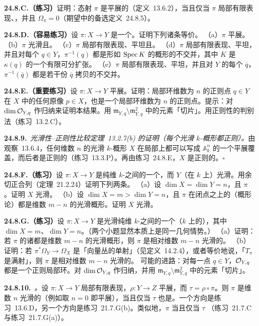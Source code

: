 \textbf{24.8.C.（练习）}\quad 证明：态射 $\pi$ 是平展的（\mbox{定义~13.6.2}），当且仅当 $\pi$ 局部有限表现、\trFlat，并且 $\Omega_\pi=0$（\mbox{期望中的备选定义~24.8.5}）。

\textbf{24.8.D.（容易练习）}\quad 设 $\pi\colon X\to Y$ 是一个\trMorphism。证明下列诸条等价。
（a）$\pi$ 平展。
（b）$\pi$ 光滑且\trUnramified。
（c）$\pi$ 局部有限表现、平坦且\trUnramified。
（d）$\pi$ 局部有限表现、平坦，并且对每个 $q\in Y$，$\pi^{-1}(q)$ 都是形如 $\operatorname{Spec} K$ 的概形的不交并，其中 $K$ 是 $\kappa(q)$ 的一个有限可分扩张。
（e）$\pi$ 局部有限表现、平坦，并且对 $Y$ 的每个\emph{\trGeometricPoint}{} $\overline{q}$，$\pi^{-1}(\overline{q})$ 都是若干份 $\overline{q}$ 拷贝的不交并。

\textbf{24.8.E.（重要练习）}\quad 设 $\pi\colon X\to Y$ 平展。证明：局部环维数为 $n$ 的正则点 $q\in Y$ 在 $X$ 中的任何原像 $p\in X$，也是一个局部环维数为 $n$ 的正则点。提示：对 $\dim\mathcal{O}_{Y,q}$ 作归纳来证明本结果。用 $\mathfrak{m}_{Y,q}\setminus\mathfrak{m}_{Y,q}^2$ 中的元素「切片」。用正则性的\trSlicing{}判别法（\mbox{练习~13.2.C}）。

\textbf{24.8.9.}\ \emph{光滑性--正则性比较\mbox{定理~13.2.7(b)} 的证明（每个光滑 $k$-概形都正则）。}\quad 由\mbox{观察~13.6.4}，任何维数 $n$ 的光滑 $k$-概形 $X$ 在局部上都可以写成 $\mathbb{A}^n_k$ 的一个平展覆盖，而后者是正则的（\mbox{练习~13.3.P}）。再由\mbox{练习~24.8.E}，$X$ 是正则的。\hfill$\square$

\textbf{24.8.F.（练习）}\quad 设 $\pi\colon X\to Y$ 是纯维 $k$-\trVariety{}之间的一个\trMorphism，而 $Y$（在 $k$ 上）光滑。用余切正合列（\mbox{定理~21.2.24}）证明下列两条。
（a）设 $\dim X=\dim Y=n$，且 $\pi$ \trUnramified。证明 $X$ 光滑。
（b）设 $\dim X=m>\dim Y=n$，且 $\pi$ 在闭点之上的（概形论）\trFiber{}都是维数 $m-n$ 的光滑概形。证明 $X$ 光滑。

\textbf{24.8.G.（练习）}\quad 设 $\pi\colon X\to Y$ 是光滑纯维 $k$-\trVariety{}之间的一个（$k$ 上的）\trMorphism，其中 $\dim X=m$、$\dim Y=n$。（两个小题显然本质上是同一几何情势。）
（a）证明：若 $\pi$ 的诸\trFiber{}都是维数 $m-n$ 的光滑概形，则 $\pi$ 是相对维数 $m-n$ 光滑的。
（b）证明：若 $\pi^*\Omega_Y\to\Omega_X$ 是「向量丛的单射」（见\mbox{定义~14.2.4}），或者等价地说，「$T_\pi$ 是满射」，则 $\pi$ 是相对维数 $m-n$ 光滑的。
可能的进路：对每一点 $q\in Y$，$\mathcal{O}_{Y,q}$ 都是一个正则局部环。对 $\dim\mathcal{O}_{Y,q}$ 作归纳，并用 $\mathfrak{m}_{Y,q}\setminus\mathfrak{m}_{Y,q}^2$ 中的元素「切片」。

\textbf{24.8.10.}\ \emph{\trhRemark。}\quad 设 $\pi\colon X\to Y$ 局部有限表现，$\rho\colon Y\to Z$ 平展，而 $\tau=\rho\circ\pi$。则 $\pi$ 是维数 $n$ 光滑的（例如取 $n=0$ 即平展），当且仅当 $\tau$ 也是。一个方向是\mbox{练习~13.6.D}，另一个方向是\mbox{练习~21.7.G}(b)。类似地，$\pi$ \trUnramified{}当且仅当 $\tau$ \trUnramified{}（\mbox{练习~21.7.C} 与\mbox{练习~21.7.G}(a)）。

